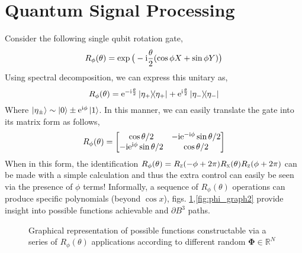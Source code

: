\documentclass{article}
\begin{document}
\clearpage
\section{Quantum Signal Processing}
Consider the following single qubit rotation gate,
\begin{equation}
    R_\phi(\theta) = \exp\big(-\mathrm{i} \frac{\theta}{2}(\cos\phi X + \sin\phi Y)\big)
\end{equation}
Using spectral decomposition, we can express this unitary as,
\begin{equation}
    R_\phi(\theta) = \mathrm{e}^{-\mathrm{i}\frac{\theta}{2}}\ketbra{\eta_+} + \mathrm{e}^{\mathrm{i}\frac{\theta}{2}}\ketbra{\eta_-}
\end{equation}
Where $\ket{\eta_\pm} \sim \ket{0} \pm \mathrm{e}^{\mathrm{i} \phi}\ket{1}$. In this manner, we can easily translate the gate into its matrix form as follows,
\begin{equation}\label{eq:raw_ctrlrot}
    R_\phi(\theta) = \begin{bmatrix}
                        \cos\theta/2 & -\mathrm{i} \mathrm{e}^{-\mathrm{i}\phi}\sin\theta/2 \\
                        -\mathrm{i} \mathrm{e}^{\mathrm{i}\phi}\sin\theta/2 & \cos\theta/2
                     \end{bmatrix}
\end{equation}
When in this form, the identification $R_\phi(\theta) = R_{\textsc{z}}(-\phi + 2\pi)R_{\textsc{x}}(\theta) R_{\textsc{z}}(\phi + 2\pi)$ can be made with a simple calculation and thus the extra control can easily be seen via the presence of $\phi$ terms! Informally, a sequence of $R_\phi(\theta)$ operations can produce specific polynomials (beyond $\cos x$), figs. \ref{fig:phi_graph1},\ref{fig:phi_graph2} provide insight into possible functions achievable and $\partial B^3$ paths. 

\begin{figure}[!ht]
    \centering
    \caption{Graphical representation of possible functions constructable via a series of $R_\phi(\theta)$ applications according to different random $\boldsymbol{\Phi}\in\mathbb{R}^N$}
    \label{fig:phi_graph1}
\end{figure}
\end{document}
